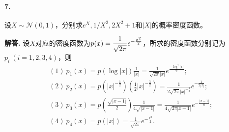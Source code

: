 \documentclass[12pt, a4paper, oneside]{ctexart}
\newenvironment{solution}{\par\noindent\textbf{解答. }}{\bigskip\par}
\begin{document}
\paragraph{7.}设$X\sim\mathcal{N}(0,1)$，分别求$e^X,1/X^2,2X^2+1$和$|X|$的概率密度函数。
\begin{solution}设$X$对应的密度函数为$\displaystyle p(x) = \frac{1}{\sqrt{2\pi}}e^{-\frac{x^2}{2}}$，所求的密度函数分别记为$p_i\ (i=1,2,3,4)$，则
    \begin{equation*}
        \begin{aligned}
            &(1)\ p_1(x) = p(\log |x|)\frac{1}{|x|} = \frac{1}{\sqrt{2\pi}|x|}e^{\frac{-\log^2|x|}{2}};\\
            &(2)\ p_2(x) = p(|x|^{-\frac{1}{2}})(\frac{1}{2}|x|^{-\frac{3}{2}}) = \frac{1}{2\sqrt{2\pi}|x|^{-\frac{3}{2}}}e^{-\frac{1}{2|x|}};\\
            &(3)\ p_3(x) = p(\frac{\sqrt{|x-1|}}{2})\frac{1}{4\sqrt{|x-1|}} = \frac{1}{4\sqrt{2\pi|x-1|}}e^{-\frac{|x-1|}{8}};\\
            &(4)\ p_4(x) = p(|x|) = \frac{1}{\sqrt{2\pi}}e^{-\frac{x^2}{2}}.
        \end{aligned}
    \end{equation*}
\end{solution}
\end{document}
